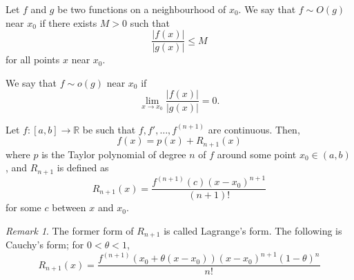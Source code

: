 \documentclass[11pt]{article}
\def\R{\mathbb{R}}
\theoremstyle{definition}
\theoremstyle{remark}
\newtheorem*{remark}{Remark}
\numberwithin{equation}{module}
\begin{document}
    \begin{definition}
        Let $f$ and $g$ be two functions on a neighbourhood of $x_0$. We say that $f
        \sim O(g)$ near $x_0$ if there exists $M > 0$ such that \[
            \frac{|f(x)|}{|g(x)|} \leq M
        \] for all points $x$ near $x_0$.

        We say that $f \sim o(g)$ near $x_0$ if \[
            \lim_{x \to x_0} \frac{|f(x)|}{|g(x)|} = 0.
        \] 
    \end{definition}

    \begin{theorem}
        Let $f\colon [a, b] \to \R$ be such that $f, f', \dots, f^{(n + 1)}$ are
        continuous. Then, \[
            f(x) = p(x) + R_{n + 1}(x)
        \] where $p$ is the Taylor polynomial of degree $n$ of 
        $f$ around some point $x_0 \in (a, b)$, and $R_{n + 1}$ is defined as \[
            R_{n + 1}(x) = \frac{f^{(n + 1)}(c)(x - x_0)^{n + 1}}{(n + 1)!}
        \] for some $c$ between $x$ and $x_0$.

        \begin{remark}
            The former form of $R_{n + 1}$ is called Lagrange's form. The following
            is Cauchy's form; for $0 < \theta < 1$, \[
                R_{n + 1}(x) = \frac{f^{(n + 1)}(x_0 + \theta(x - x_0))(x -
                x_0)^{n + 1}(1 - \theta)^n}{n!}
            \] 
        \end{remark}
    \end{theorem}
\end{document}
